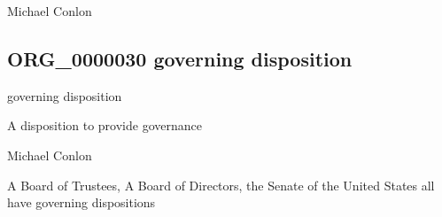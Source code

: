 \documentclass[letterpaper,10pt,english]{sphinxmanual}
\begin{document}
\begin{sphinxShadowBox}

\sphinxAtStartPar
Michael Conlon 
\end{sphinxShadowBox}
\begin{quote}

\ignorespaces \end{quote}


\subsection{ORG\_0000030 \sphinxhyphen{} governing disposition}
\label{\detokenize{doc-ORG_0000030:org-0000030-governing-disposition}}\label{\detokenize{doc-ORG_0000030:index-0}}\label{\detokenize{doc-ORG_0000030::doc}}
\begin{sphinxShadowBox}

\sphinxAtStartPar
governing disposition
\end{sphinxShadowBox}

\begin{sphinxShadowBox}

\sphinxAtStartPar
{\hyperref[\detokenize{doc-BFO_0000016::doc}]{}}
\end{sphinxShadowBox}

\begin{sphinxShadowBox}

\sphinxAtStartPar
A disposition to provide governance
\end{sphinxShadowBox}

\begin{sphinxShadowBox}

\sphinxAtStartPar
Michael Conlon 
\end{sphinxShadowBox}

\begin{sphinxShadowBox}

\sphinxAtStartPar
A Board of Trustees, A Board of Directors, the Senate of the United States all have governing dispositions
\end{sphinxShadowBox}
\end{document}
